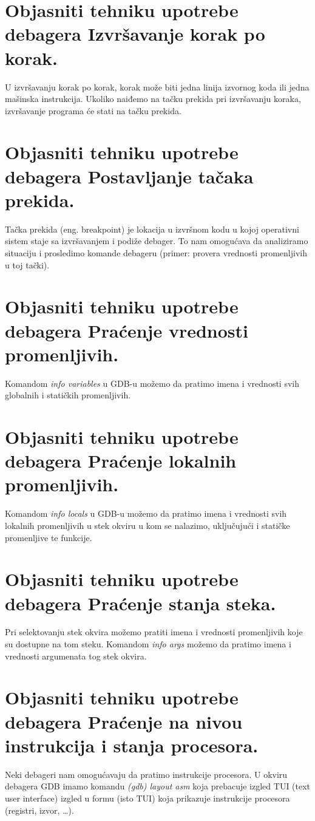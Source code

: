 \documentclass[a4paper]{article}
\begin{document}
\section{Objasniti tehniku upotrebe debagera Izvršavanje korak po korak.}
  U izvršavanju korak po korak, korak može biti jedna linija izvornog koda ili jedna mašinska 
  instrukcija. Ukoliko naiđemo na tačku prekida pri izvršavanju koraka, izvršavanje programa će 
  stati na tačku prekida.

\section{Objasniti tehniku upotrebe debagera Postavljanje tačaka prekida.}
  Tačka prekida (eng. breakpoint) je lokacija u izvršnom kodu u kojoj operativni sistem staje 
  sa izvršavanjem i podiže debager. To nam omogućava da analiziramo situaciju i 
  prosledimo komande debageru (primer: provera vrednosti promenljivih u toj tački).

\section{Objasniti tehniku upotrebe debagera Praćenje vrednosti promenljivih.}
  Komandom \textit{info variables} u GDB-u možemo da pratimo imena i vrednosti svih globalnih i 
  statičkih promenljivih.

\section{Objasniti tehniku upotrebe debagera Praćenje lokalnih promenljivih.}
  Komandom \textit{info locals} u GDB-u možemo da pratimo imena i vrednosti svih lokalnih 
  promenljivih u stek okviru u kom se nalazimo, uključujući i statičke promenljive te funkcije.

\section{Objasniti tehniku upotrebe debagera Praćenje stanja steka.}
  Pri selektovanju stek okvira možemo pratiti imena i vrednosti 
  promenljivih koje su dostupne na tom steku. Komandom \textit{info args} možemo 
  da pratimo imena i vrednosti argumenata tog stek okvira.

\section{Objasniti tehniku upotrebe debagera Praćenje na nivou instrukcija i stanja procesora.}
  Neki debageri nam omogućavaju da pratimo instrukcije procesora. U okviru debagera GDB imamo komandu 
  \textit{(gdb) layout asm} koja prebacuje izgled TUI (text user interface) izgled u formu (isto TUI)
  koja prikazuje instrukcije procesora (registri, izvor, \dots). \cite{gdb_commands}
\end{document}
